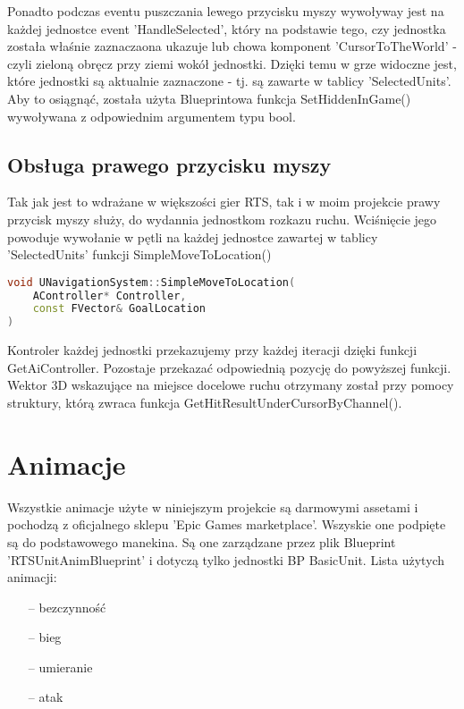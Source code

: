 \documentclass[12pt]{report}
\begin{document}
Ponadto podczas eventu puszczania lewego przycisku myszy wywoływay jest na każdej jednostce event 'HandleSelected', który na podstawie tego, czy jednostka została właśnie zaznaczaona ukazuje lub chowa komponent 'CursorToTheWorld' - czyli zieloną obręcz przy ziemi wokół jednostki. Dzięki temu w grze widoczne jest, które jednostki są aktualnie zaznaczone - tj. są zawarte w tablicy 'SelectedUnits'. Aby to osiągnąć, została użyta Blueprintowa funkcja SetHiddenInGame() wywoływana z odpowiednim argumentem typu bool.

\subsection{Obsługa prawego przycisku myszy}
Tak jak jest to wdrażane w większości gier RTS, tak i w moim projekcie prawy przycisk myszy służy, do wydannia jednostkom rozkazu ruchu. Wciśnięcie jego powoduje wywołanie w pętli na każdej jednostce zawartej w tablicy 'SelectedUnits' funkcji SimpleMoveToLocation()

\begin{lstlisting}[language=C++, backgroundcolor=\color{black!5}, basicstyle=\footnotesize, caption=Funkcja SimpleMoveToLocation() w klasie UNavigationSystem.]
void UNavigationSystem::SimpleMoveToLocation(
    AController* Controller, 
    const FVector& GoalLocation
)
\end{lstlisting}
Kontroler każdej jednostki przekazujemy przy każdej iteracji dzięki funkcji GetAiController. Pozostaje przekazać odpowiednią pozycję do powyższej funkcji. Wektor 3D wskazujące na miejsce docelowe ruchu otrzymany został przy pomocy struktury, którą zwraca funkcja GetHitResultUnderCursorByChannel(). 

\section{Animacje}
Wszystkie animacje użyte w niniejszym projekcie są darmowymi assetami i pochodzą z oficjalnego sklepu 'Epic Games marketplace'. Wszyskie one podpięte są do podstawowego manekina. Są one zarządzane przez plik Blueprint 'RTSUnitAnimBlueprint' i dotyczą tylko jednostki BP BasicUnit. Lista użytych animacji:
\begin{itemize}
\item[--] bezczynność 
\item[--] bieg
\item[--] umieranie 
\item[--] atak 
\end{itemize}
\end{document}
